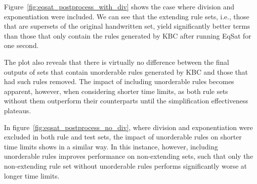 Figure~\ref{fig:eqsat_postprocess_with_div} shows the case where division and exponentiation were included. We can see that the extending rule sets, i.e., those that are supersets of the original handwritten set, yield significantly better terms than those that only contain the rules generated by KBC after running EqSat for one second.  

The plot also reveals that there is virtually no difference between the final outputs of sets that contain unorderable rules generated by KBC and those that had such rules removed. The impact of including unorderable rules becomes apparent, however, when considering shorter time limits, as both rule sets without them outperform their counterparts until the simplification effectiveness plateaus.

In figure~\ref{fig:eqsat_postprocess_no_div}, where division and exponentiation were excluded in both rule and test sets, the impact of unorderable rules on shorter time limits shows in a similar way. In this instance, however, including unorderable rules improves performance on non-extending sets, such that only the non-extending rule set without unorderable rules performs significantly worse at longer time limits.

